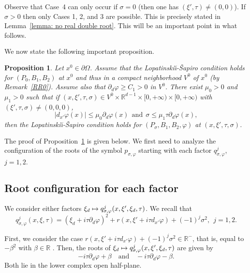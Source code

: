 \documentclass[10pt]{amsart}
\newcommand{\quand}{\quad\text{and}\quad}
\newcommand\mto{\mathchoice{\longmapsto}{\mapsto}{\mapsto}{\mapsto}}
\theoremstyle{plain}
\newtheorem{proposition}[theorem]{Proposition}
\theoremstyle{definition}
\def\R{\mathbb{R}}
\newcommand{\LS}{Lopatinski\u{\i}-\v{S}apiro\xspace}
\newcommand{\Psig}{P_{\sigma}}
\newcommand{\pconj}{p_{\sigma,\varphi}}
\newcommand{\qconj}{q_{\sigma,\varphi}}
\begin{document}
Observe that Case~4 can only occur if $\sigma =0$ (then one has
$(\xi',\tau) \neq (0,0)$). If $\sigma > 0$ then only Cases 1, 2, and 3
are possible. This is precisely stated in Lemma~\ref{lemma: no real
double root}. This will be an important point in what follows.

We now state the following important proposition.

\begin{proposition}
\label{prop: LS after conjugation}
Let $x^0\in\partial\Omega$. Assume that the \LS condition holds for
$(P_0, B_1, B_2)$ at $x^0$ and thus in a compact neighborhood $V^0$
of $x^0$ (by Remark~\ref{RR0}). Assume also that
$\partial_d\varphi\geq C_1> 0$ in $V^0$. There exist $\mu_0>0$ and
$\mu_1>0$ such that if
$(x,\xi',\tau,\sigma)\in V^0\times\R^{d-1}\times[0,+\infty) \times[0,+\infty) $ with
$(\xi',\tau,\sigma)\neq (0, 0,0)$,
\begin{equation*}
|d_{x'}\varphi(x)|\leq \mu_0\partial_d\varphi(x)
\ \ \text{and} \ \
\sigma \leq \mu_1\tau \partial_d\varphi(x),
\end{equation*}
then the \LS condition holds for $(\Psig , B_1, B_2, \varphi)$ at
$(x,\xi',\tau,\sigma)$.
\end{proposition}

The proof of Proposition~\ref{prop: LS after conjugation} is given below. We first need to
analyze the configuration of the roots of the symbol
$\pconj$ starting with each factor $\qconj^j$, $j=1,2$.

\subsection{Root configuration for each factor}
\label{sec: Root configuration for each factor}
We consider either factors $\xi_d\mto
\qconj^j(x,\xi',\xi_d,\tau)$. We recall that
\begin{equation*}
\qconj^j(x,\xi,\tau)
=(\xi_d+i\tau\partial_d\varphi)^2
+r(x,\xi'+i\tau d_{x'}\varphi) + (-1)^j \sigma^2,
\ \ j=1,2.
\end{equation*}

First, we consider the case $r(x,\xi'+i\tau
d_{x'}\varphi) + (-1)^j \sigma^2 \in \R^-$, that is, equal to $-
\beta^2$ with $\beta\in \R$ .
Then, the roots of $\xi_d\mto
\qconj^j(x,\xi',\xi_d,\tau)$ are given by
\begin{equation*}
-i\tau\partial_d\varphi + \beta
\quand
-i\tau\partial_d\varphi - \beta.
\end{equation*}
Both lie in the lower complex open half-plane.
\end{document}

